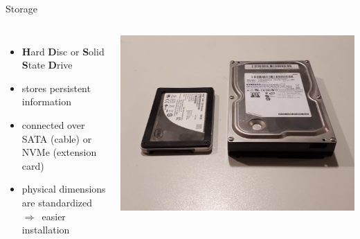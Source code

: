 \documentclass[10pt, graphics, aspectratio=169, table]{beamer}
\newcommand{\ra}{$\Rightarrow$\ }
\begin{document}
    \begin{frame}{Storage}
        \begin{columns}
                \begin{itemize}
                    \item \textbf{H}ard \textbf{D}isc or \textbf{S}olid \textbf{S}tate \textbf{D}rive
                    \item stores persistent information
                    \item connected over SATA (cable) or NVMe (extension card)
                    \item physical dimensions are standardized \ra easier installation
                \end{itemize}
                \center\includegraphics[scale=0.1]{img/hdd_ssd.jpeg}
        \end{columns}
    \end{frame}
\end{document}
